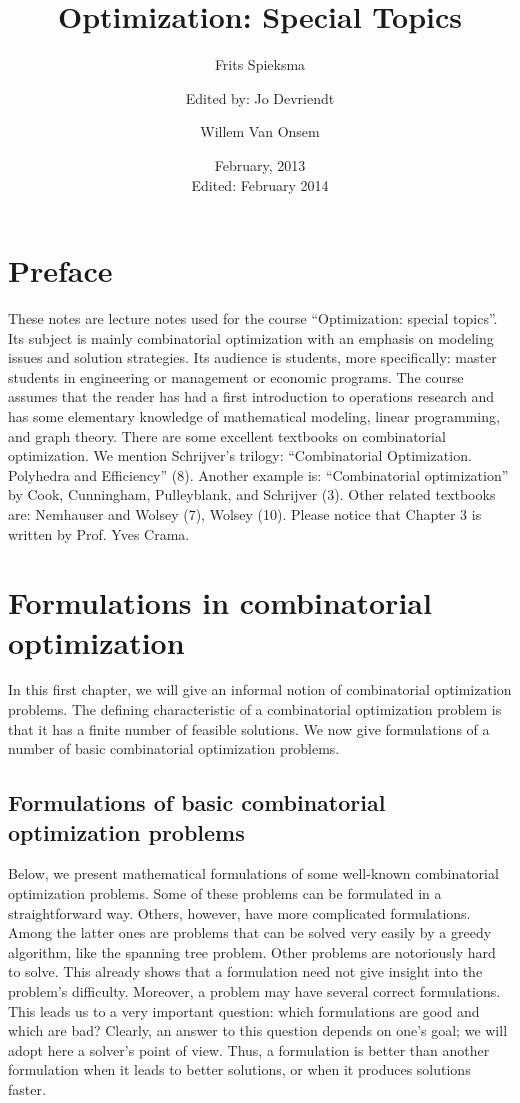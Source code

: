\documentclass[titlepage]{book}
\title{Optimization: Special Topics}
\author{Frits Spieksma\and Edited by: Jo Devriendt \and Willem Van Onsem}
\date{February, 2013\\Edited: February 2014}
\begin{document}
\begin{titlepage}
\maketitle
\end{titlepage}
\tableofcontents
\chapter*{Preface}
These notes are lecture notes used for the course ``Optimization: special topics''. Its subject is mainly
combinatorial optimization with an emphasis on modeling issues and solution strategies. Its audience is
students, more specifically: master students in engineering or management or economic programs.
The course assumes that the reader has had a first introduction to operations research and has some
elementary knowledge of mathematical modeling, linear programming, and graph theory.
There are some excellent textbooks on combinatorial optimization. We mention Schrijver's trilogy: ``Combinatorial Optimization. Polyhedra and Efficiency'' (8). Another example is: ``Combinatorial optimization'' by Cook, Cunningham, Pulleyblank, and Schrijver (3). Other related textbooks are: Nemhauser
and Wolsey (7), Wolsey (10).
Please notice that Chapter 3 is written by Prof. Yves Crama.

\chapter{Formulations in combinatorial optimization}
In this first chapter, we will give an informal notion of combinatorial optimization problems. The defining
characteristic of a combinatorial optimization problem is that it has a finite number of feasible solutions.
We now give formulations of a number of basic combinatorial optimization problems.

\section{Formulations of basic combinatorial optimization problems}

Below, we present mathematical formulations of some well-known combinatorial optimization problems.
Some of these problems can be formulated in a straightforward way. Others, however, have more complicated formulations. Among the latter ones are problems that can be solved very easily by a greedy
algorithm, like the spanning tree problem. Other problems are notoriously hard to solve. This already
shows that a formulation need not give insight into the problem's difficulty. Moreover, a problem may
have several correct formulations. This leads us to a very important question: which formulations are
good and which are bad? Clearly, an answer to this question depends on one's goal; we will adopt here
a solver's point of view. Thus, a formulation is better than another formulation when it leads to better
solutions, or when it produces solutions faster.
\end{document}
